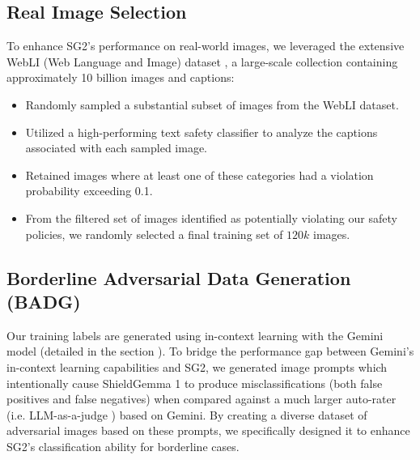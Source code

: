 \subsection{Real Image Selection}

To enhance SG2's performance on real-world images, we leveraged the extensive WebLI (Web Language and Image) dataset \citep{chen2022pali}, a large-scale collection containing approximately 10 billion images and captions:

\begin{itemize}[leftmargin=10pt]
    \item Randomly sampled a substantial subset of images from the WebLI dataset.
    \item Utilized a high-performing text safety classifier to analyze the captions associated with each sampled image.
    \item Retained images where at least one of these categories had a violation probability exceeding 0.1.
    \item From the filtered set of images identified as potentially violating our safety policies, we randomly selected a final training set of $120k$ images.
\end{itemize}

\subsection{Borderline Adversarial Data Generation (BADG)}
Our training labels are generated using in-context learning with the Gemini model (detailed in the section ). To bridge the performance gap between Gemini's in-context learning capabilities and SG2, we generated image prompts which intentionally cause ShieldGemma 1 \citep{zeng2024shieldgemma} to produce misclassifications (both false positives and false negatives) when compared against a much larger auto-rater (i.e. LLM-as-a-judge \citep{gu2024survey}) based on Gemini. By creating a diverse dataset of adversarial images based on these prompts, we specifically designed it to enhance SG2's classification ability for borderline cases.
